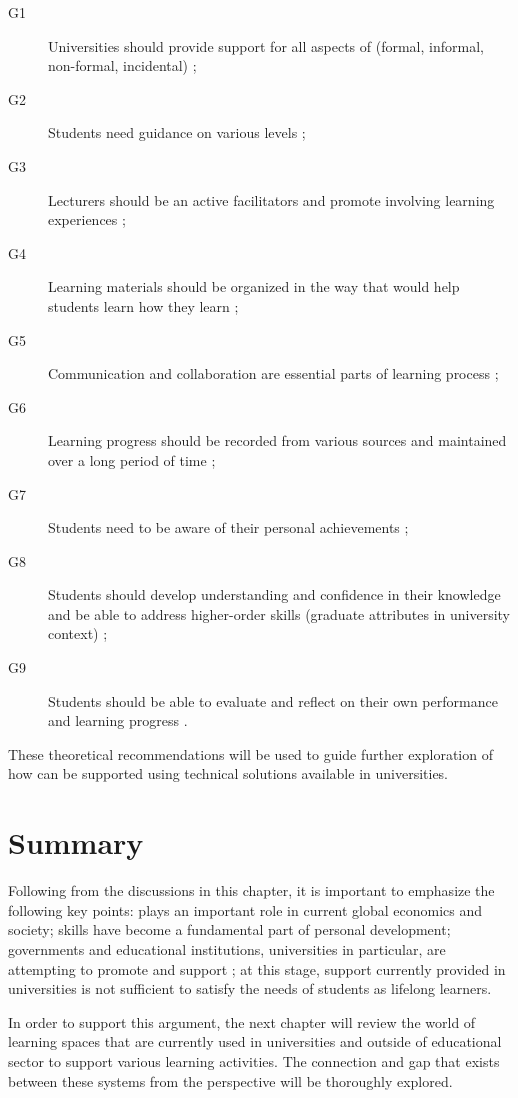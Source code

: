 \begin{description}
  \item[G1] Universities should provide support for all aspects of \LLLs
  (formal, informal, non-formal, incidental) \citep{Smidt2011};
  \item[G2] Students need guidance on various levels \citep{Leone2019};
  \item[G3] Lecturers should be an active facilitators and promote involving
  learning experiences \citep{Leone2019}; 
  \item[G4] Learning materials should be organized in the way that would help
students learn how they learn \citep{Medel-Anonuevo2001};
  \item[G5] Communication and collaboration are essential parts of learning
  process \citep{Schaffert2008};
  \item[G6] Learning progress should be recorded from various sources and
  maintained over a long period of time \citep{Kay2008};
  \item[G7] Students need to be aware of their personal achievements
\citep{Schuetze2006};
  \item[G8] Students should develop understanding and confidence in their
  knowledge and be able to address higher-order skills (graduate attributes in university
  context) \citep{Hart1999};
  \item[G9] Students should be able to evaluate and reflect on their own
  performance and learning progress \citep{Mourtos2003}.
\end{description} 

These theoretical recommendations will be used to guide further exploration of
 how \LLLs can be supported using technical solutions available in universities.

\section{Summary} 

Following from the discussions in this chapter, it is important to emphasize
the following key points: \LLLs plays an important role in current global
economics and society; \LLLs skills have become a fundamental part of personal
development; governments and educational institutions, universities in
particular, are attempting to promote and support \LLLsn; at this stage, \LLLs
support currently provided in universities is not sufficient to satisfy the
needs of students as lifelong learners.

In order to support this argument, the next chapter will review the world of
learning spaces that are currently used in universities and outside of
educational sector to support various learning activities. The connection and
gap that exists between these systems from the \LLLs perspective will be
thoroughly explored.
